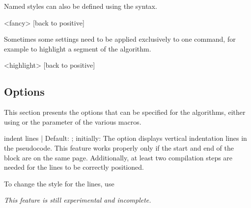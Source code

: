 \documentclass[a4paper, 11pt]{article}
\begin{document}
Named styles can also be defined using the  syntax.

\begin{PDExample}
    \begin{algorithmic}<fancy>
            [back to positive]
        \EndIf
    \end{algorithmic}
\end{PDExample}

Sometimes some settings need to be applied exclusively to one command, for example to highlight a segment of the algorithm.

\begin{PDExample}
    \begin{algorithmic}
        <highlight>
            [back to positive]
        \EndIf
    \end{algorithmic}
\end{PDExample}

\subsection{Options}\label{sec:options}
%
This section presents the options that can be specified for the algorithms, either using  or the  parameter of the various macros.

\begin{Optiondef}{indent lines}{ | }{Default: ; initially: }
    The  option displays vertical indentation lines in the pseudocode. This feature works properly only if the start and end of the block are on the same page. Additionally, at least two compilation steps are needed for the lines to be correctly positioned.

    To change the style for the lines, use 

    \textit{This feature is still experimental and incomplete.}
\end{Optiondef}
\end{document}
